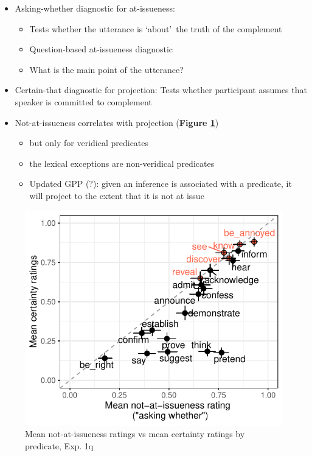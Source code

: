 \documentclass[11pt]{article}
\begin{document}
			\begin{itemize}
				
				\item Asking-whether diagnostic for at-issueness:
				\begin{itemize}
					\item Tests whether the utterance is \lq about\rq\ the truth of the complement
					\item Question-based at-issueness diagnostic
					\item What is the main point of the utterance?
				\end{itemize}
				

				\item Certain-that diagnostic for projection: Tests whether participant assumes that speaker is committed to complement

				\item Not-at-issueness correlates with projection (\textbf{Figure \ref{fig:q1-correl}})
				\begin{itemize}
					\item but only for veridical predicates
					\item the lexical exceptions are non-veridical predicates
					\item Updated GPP (?): given an inference is associated with a predicate, it will project to the extent that it is not at issue
				\end{itemize}

			\end{itemize}

			\begin{figure}[h]
				\centering
				\includegraphics[]{figures/q1-correl.pdf}
				\caption{Mean not-at-issueness ratings vs mean certainty ratings by predicate, Exp. 1q}
				\label{fig:q1-correl}
			\end{figure}
\end{document}
